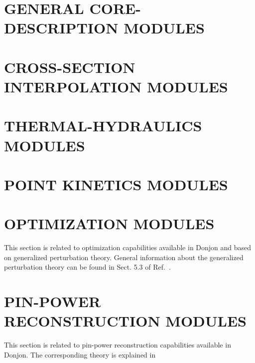 \section{GENERAL CORE-DESCRIPTION MODULES}\label{sect:modesc1}


\vskip 1.0cm

\vskip 1.0cm

\vskip 1.0cm

\vskip 1.0cm

\vskip 1.0cm

\vskip 1.0cm

\vskip 1.0cm

\vskip 1.0cm

\vskip 1.0cm

\vskip 1.0cm

\vskip 1.0cm

\vskip 1.0cm

\vskip 1.0cm

\vskip 1.0cm

\vskip 1.0cm

\vskip 1.0cm

\vskip 1.0cm

\vskip 1.0cm

\vskip 1.0cm


\section{CROSS-SECTION INTERPOLATION MODULES}\label{sect:modesc2}


\vskip 1.0cm

\vskip 1.0cm

\vskip 1.0cm

\vskip 1.0cm

\vskip 1.0cm

\vskip 1.0cm

\vskip 1.0cm

\section{THERMAL-HYDRAULICS MODULES}\label{sect:modesc3}



\section{POINT KINETICS MODULES}\label{sect:modesc4}




\section{OPTIMIZATION MODULES}\label{sect:modesc5}

This section is related to optimization capabilities available in Donjon and
based on generalized perturbation theory.\cite{optex1,optex2} General information
about the generalized perturbation theory can be found in Sect. 5.3 of Ref.~.


\vskip 1.0cm

\vskip 1.0cm

\vskip 1.0cm

\vskip 1.0cm

\vskip 1.0cm

\vskip 1.0cm


\section{PIN-POWER RECONSTRUCTION MODULES}\label{sect:modesc6}

This section is related to pin-power reconstruction capabilities available in Donjon.
The corresponding theory is explained in \cite{Chambon2014,Fliscounakis2011} 



